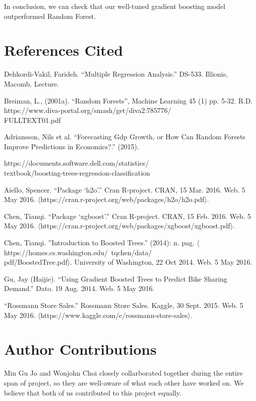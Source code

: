 \documentclass[letterpaper,twocolumn,11pt]{article}
\begin{document}
In conclusion, we can check that our well-tuned gradient boosting model outperformed Random Forest. 

\section{References Cited}

Dehkordi-Vakil, Farideh. ``Multiple Regression Analysis.'' DS-533. Illionis, Macomb. Lecture.

Breiman, L., (2001a). ``Random Forests'', Machine Learning 45 (1) pp. 5-32.
R.D. https://www.diva-portal.org/smash/get/diva2:785776/\\
FULLTEXT01.pdf

Adriansson, Nils et al. “Forecasting Gdp Growth, or How Can Random Forests Improve Predictions in Economics?.” (2015).

https://documents.software.dell.com/statistics/\\
textbook/boosting-trees-regression-classification

Aiello, Spencer. ``Package ‘h2o'.'' Cran R-project. CRAN, 15 Mar. 2016. Web. 5 May 2016. $\langle$https://cran.r-project.org/web/packages/h2o/h2o.pdf$\rangle$.

Chen, Tianqi. ``Package ‘xgboost'.'' Cran R-project. CRAN, 15 Feb. 2016. Web. 5 May 2016. $\langle$https://cran.r-project.org/web/packages/xgboost/xgboost.pdf$\rangle$.

Chen, Tianqi. ”Introduction to Boosted Trees.” (2014): n. pag. $\langle$https://homes.cs.washington.edu/~tqchen/data/\\
pdf/BoostedTree.pdf$\rangle$. University of Washington, 22 Oct 2014. Web. 5 May 2016.

Gu, Jay (Haijie). ``Using Gradient Boosted Trees to Predict Bike Sharing Demand.'' Dato. 19 Aug. 2014. Web. 5 May 2016.

``Rossmann Store Sales.'' Rossmann Store Sales. Kaggle, 30 Sept. 2015. Web. 5 May 2016. $\langle$https://www.kaggle.com/c/rossmann-store-sales$\rangle$.

\section{Author Contributions}
Min Gu Jo and Wonjohn Choi closely collarborated together during the entire span of project, so they are well-aware of what each other have worked on. We believe that both of us contributed to this project equally.
\end{document}
